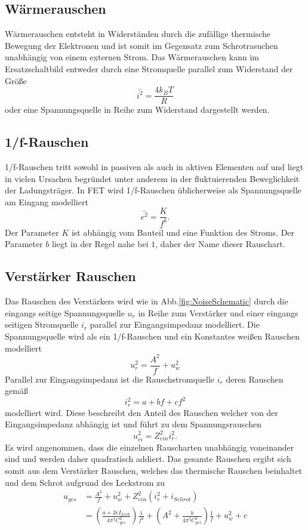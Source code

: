 \subsection*{Wärmerauschen}
Wärmerauschen entsteht in Widerständen durch die zufällige thermische Bewegung der Elektronen und ist somit im Gegensatz zum Schrotrasuchen unabhängig von einem externen Strom.
Das Wärmerauschen kann im Ersatzschaltbild entweder durch eine Stromquelle parallel zum Widerstand der Größe
\begin{equation}
\stackrel{-}{i^2} = \frac{4k_B T}{R}
\end{equation}
oder eine Spannungsquelle in Reihe zum Widerstand dargestellt werden.

\subsection*{1/f-Rauschen}
1/f-Rauschen tritt sowohl in passiven als auch in aktiven Elementen auf und liegt in vielen Ursachen begründet unter anderem in der fluktuierenden Beweglichkeit der Ladungsträger.
In FET wird 1/f-Rauschen üblicherweise als Spannungsquelle am Eingang modelliert
\begin{equation}
\stackrel{-}{e^2} = \frac{K}{f^b}.
\end{equation}
Der Parameter $K$ ist abhängig vom Bauteil und eine Funktion des Stroms.
Der Parameter $b$ liegt in der Regel nahe bei $1$, daher der Name dieser Rauschart.

\subsection*{Verstärker Rauschen}
Das Rauschen des Verstärkers wird wie in Abb.\ref{fig:NoiseSchematic} durch die eingangs seitige Spannungsquelle $u_r$ in Reihe zum Verstärker und einer eingangs seitigen  Stromquelle $i_r$ parallel zur Eingangsimpedanz modelliert.
Die Spannungsquelle wird als ein 1/f-Rauschen und ein Konstantes weißen Rauschen modelliert\cite{horowitz1980art}
\begin{equation}
u^2_r = \frac{A^2}{f} + u^2_w
\end{equation}
Parallel zur Eingangsimpedanz ist die Rauschstromquelle $i_r$ deren Rauschen gemäß
\begin{equation}
i^2_r = a + bf + cf^2
\end{equation}
modelliert wird\cite{Thomas2016}.
Diese beschreibt den Anteil des Rauschen welcher von der Eingangsimpedanz abhängig ist und führt zu dem Spannungsrauschen
\begin{equation}
u^2_{ri} = Z^2_{ein}i^2_r.
\end{equation}
Es wird angenommen, dass die einzelnen Rauscharten unabhängig voneinander sind und werden daher quadratisch addiert.
Das gesamte Rauschen ergibt sich somit aus dem Verstärker Rauschen, welches das thermische Rauschen beinhaltet und dem Schrot aufgrund des Leckstrom zu
\begin{align}
u_{ges} &= \frac{A^2}{f} + u^2_w + Z^2_{ein}(i^2_r + i_{Schrot}) \\
&= \left(\frac{a + 2eI_{Leck}}{4\pi^2 C^2_{ges}}\right)\frac{1}{f^2} + \left(A^2 + \frac{b}{4\pi^2 C^2_{ges}}\right)\frac{1}{f} + u^2_w + c
\label{eq:Rauschen}
\end{align}
